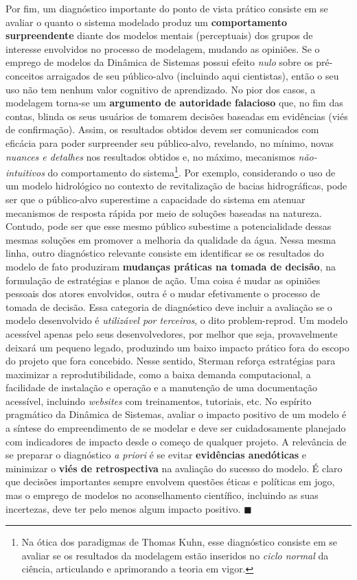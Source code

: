 \documentclass[./main.tex]{subfiles}
\begin{document}
\par Por fim, um diagnóstico importante do ponto de vista prático consiste em se avaliar o quanto o sistema modelado produz um \textbf{comportamento surpreendente} diante dos modelos mentais (perceptuais) dos grupos de interesse envolvidos no processo de modelagem, mudando as opiniões. Se o emprego de modelos da Dinâmica de Sistemas possui efeito \textit{nulo} sobre os pré-conceitos arraigados de seu público-alvo (incluindo aqui cientistas), então o seu uso não tem nenhum valor cognitivo de aprendizado. No pior dos casos, a modelagem torna-se um \textbf{argumento de autoridade falacioso} que, no fim das contas, blinda os seus usuários de tomarem decisões baseadas em evidências (viés de confirmação). Assim, os resultados obtidos devem ser comunicados com eficácia para poder surpreender seu público-alvo, revelando, no mínimo, novas \textit{nuances e detalhes} nos resultados obtidos e, no máximo, mecanismos \textit{não-intuitivos} do comportamento do sistema\footnote{Na ótica dos paradigmas de Thomas Kuhn, esse diagnóstico consiste em se avaliar se os resultados da modelagem estão inseridos no \textit{ciclo normal} da ciência, articulando e aprimorando a teoria em vigor.}. Por exemplo, considerando o uso de um modelo hidrológico no contexto de revitalização de bacias hidrográficas, pode ser que o público-alvo superestime a capacidade do sistema em atenuar mecanismos de resposta rápida por meio de soluções baseadas na natureza. Contudo, pode ser que esse mesmo público subestime a potencialidade dessas mesmas soluções em promover a melhoria da qualidade da água. Nessa mesma linha, outro diagnóstico relevante consiste em identificar se os resultados do modelo de fato produziram \textbf{mudanças práticas na tomada de decisão}, na formulação de estratégias e planos de ação. Uma coisa é mudar as opiniões pessoais dos atores envolvidos, outra é o mudar efetivamente o processo de tomada de decisão. Essa categoria de diagnóstico deve incluir a avaliação se o modelo desenvolvido é \textit{utilizável por terceiros}, o dito \gls{problem-reprod}.  Um modelo acessível apenas pelo seus desenvolvedores, por melhor que seja, provavelmente deixará um pequeno legado, produzindo um baixo impacto prático fora do escopo do projeto que fora concebido. Nesse sentido, Sterman reforça estratégias para maximizar a reprodutibilidade, como a baixa demanda computacional, a facilidade de instalação e operação e a manutenção de uma documentação acessível, incluindo \textit{websites} com treinamentos, tutoriais, etc. No espírito pragmático da Dinâmica de Sistemas, avaliar o impacto positivo de um modelo é a síntese do empreendimento de se modelar e deve ser cuidadosamente planejado com indicadores de impacto desde o começo de qualquer projeto. A relevância de se preparar o diagnóstico \textit{a priori} é se evitar \textbf{evidências anedóticas} e minimizar o \textbf{viés de retrospectiva} na avaliação do sucesso do modelo. É claro que decisões importantes sempre envolvem questões éticas e políticas em jogo, mas o emprego de modelos no aconselhamento científico, incluindo as suas incertezas, deve ter pelo menos algum impacto positivo. $\blacksquare$
\end{document}
